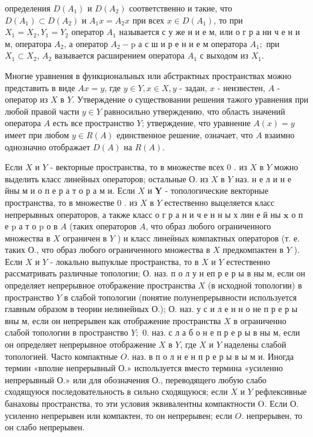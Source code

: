 \documentclass[10pt]{article}
\begin{document}
определения $D\left(A_{1}\right)$ и $D\left(A_{2}\right)$ соответственно и такие, что $D\left(A_{1}\right) \subset D\left(A_{2}\right)$ и $A_{1} x=A_{2} x$ при всех $x \in D\left(A_{1}\right)$, то при $X_{1}=X_{2}, Y_{1}=Y_{2}$ оператор $A_{1}$ называется с у же н и е м, или о г р а ни ч е н и м, оператора $A_{2}$, а оператор $A_{2}-\mathrm{p}$ а с ш и р е н и е м оператора $A_{1} ;$ при $X_{1} \subset X_{2}$, $A_{2}$ вазывается расширением оператора $A_{1}$ с выходом из $X_{1}$.

Многие уравнения в функциональных или абстрактных пространствах можно представить в виде $A x=y$, где $y \in Y, x \in X, y$ - задан, $x$ - неизвестен, $A$ - оператор из $X$ в $Y$. Утверждение о существовании решения тажого уравнения при любой правой части $y \in Y$ равносильно утверждению, что область значений оператора $A$ есть все пространство $Y$; утверждение, что уравнение $A(x)=y$ имеет при любом $y \in R(A)$ единственное решение, означает, что $\dot{A}$ взаимно однозначно отображает $D(A)$ на $R(A)$.

Если $X$ и $Y$ - векторные пространства, то в множестве всех 0 . из $X$ в $Y$ можно выделить класс линейных операторов; остальные О. из $X$ в $Y$ наз. н е л и н е йны м и о п е р а т о р а м и. Если $X$ и $\boldsymbol{Y}$ - топологические векторные пространства, то в множестве 0 . из $X$ в $Y$ естественно выцеляется класс непрерывных операторов, а также класс о г р а н и ч е н н ы х лин е й ны $\mathbf{x}$ о п е $\mathrm{p}$ а т о $\mathrm{p}$ о в $A$ (таких операторов $A$, что образ любого ограниченного множества в $X$ ограничен в $Y$ ) и класс линеӥных компактных операторов (т. е. таких О., что образ любого ограниченного множества в $X$ предкомпактен в $Y$ ). Если $X$ и $Y$ - локально выпуклые пространства, то в $X$ и $Y$ естественно рассматривать различные топологии; О. наз. п о л у н еп р е р ы в ны м, если он определяет непрерывное отображение пространства $X$ (в исходной топологии) в пространство $Y$ в слабой топологии (понятие полунепрерывности используется главным образом в теории нелинейных О.); О. наз. у с и л е н н о не п р е р ы вны м, если он непрерывен как отображение пространства $X$ в ограниченно слабой топологии в пространство $Y ;$ 0. наз. с л а б о н е п р е р ы в ны м, если он определяет непрерывное отображение $X$ в $Y$, где $X$ и $Y$ наделены слабой топологией. Часто компактные $O$. наз. в п о л н е н п р е р ы в ы м и. Иногда термин «вполне непрерывный $О$.» используется вместо термина «усиленно непрерывный О.» или для обозначения О., переводящего любую слабо сходящуюся последовательность в сильно сходящуюся; если $X$ и $Y$ рефлексивные банаховы пространства, то эти условия эквивалентны компактности $\mathrm{O}$. Если О. усиленно непрерывен или компактен, то он непрерывен; если $O$. непрерывен, то он слабо непрерывен.
\end{document}
